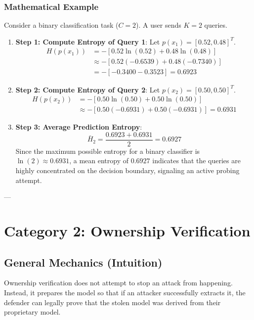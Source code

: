 \documentclass{article}
\begin{document}
\subsubsection{Mathematical Example}
Consider a binary classification task ($C=2$). A user sends $K=2$ queries.
\begin{enumerate}
    \item \textbf{Step 1: Compute Entropy of Query 1}: Let $p(x_1) = [0.52, 0.48]^T$.
    \begin{align*}
        H(p(x_1)) &= - \left[ 0.52 \ln(0.52) + 0.48 \ln(0.48) \right] \\
        &\approx - \left[ 0.52(-0.6539) + 0.48(-0.7340) \right] \\
        &= - \left[ -0.3400 - 0.3523 \right] = 0.6923
    \end{align*}
    
    \item \textbf{Step 2: Compute Entropy of Query 2}: Let $p(x_2) = [0.50, 0.50]^T$.
    \begin{align*}
        H(p(x_2)) &= - \left[ 0.50 \ln(0.50) + 0.50 \ln(0.50) \right] \\
        &\approx - \left[ 0.50(-0.6931) + 0.50(-0.6931) \right] = 0.6931
    \end{align*}
    
    \item \textbf{Step 3: Average Prediction Entropy}:
    $$\bar{H}_2 = \frac{0.6923 + 0.6931}{2} = 0.6927$$
    Since the maximum possible entropy for a binary classifier is $\ln(2) \approx 0.6931$, a mean entropy of $0.6927$ indicates that the queries are highly concentrated on the decision boundary, signaling an active probing attempt.
\end{enumerate}

---

\section{Category 2: Ownership Verification}

\subsection{General Mechanics (Intuition)}
Ownership verification does not attempt to stop an attack from happening. Instead, it prepares the model so that if an attacker successfully extracts it, the defender can legally prove that the stolen model was derived from their proprietary model.
\end{document}
